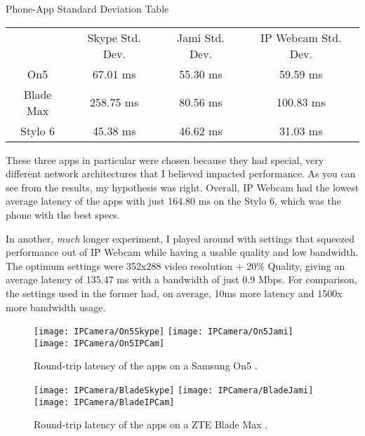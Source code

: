 \begin{centering}
Phone-App Standard Deviation Table\\[0.5cm]

\begin{tabular}{c|c|c|c}
    & Skype Std. Dev. & Jami Std. Dev. & IP Webcam Std. Dev. \\[0.5cm]
    On5 & 67.01 ms & 55.30 ms & 59.59 ms \\[0.5cm]
    Blade Max & 258.75 ms & 80.56 ms & 100.83 ms \\[0.5cm]
    Stylo 6 & 45.38 ms & 46.62 ms & 31.03 ms
\end{tabular} \newline

\end{centering}

These three apps in particular were chosen because they had special, very different network architectures that I believed impacted performance. As you can see from the results, my hypothesis was right. Overall, IP Webcam had the lowest average latency of the apps with just 164.80 ms on the Stylo 6, which was the phone with the best specs.

In another, \textit{much} longer experiment, I played around with settings that squeezed performance out of IP Webcam while having a usable quality and low bandwidth. The optimum settings were 352x288 video resolution + 20\% Quality, giving an average latency of 135.47 ms with a bandwidth of just 0.9 Mbps. For comparison, the settings used in the former had, on average, 10ms more latency and 1500x more bandwidth usage.


\begin{figure}[!htb]
    \centering
    \texttt{[image: IPCamera/On5Skype]}
    \texttt{[image: IPCamera/On5Jami]}
    \texttt{[image: IPCamera/On5IPCam]}
    \caption{
        Round-trip latency of the apps on a Samsung On5 \cite{On5}.
    }
\end{figure}

\begin{figure}[!htb]
    \centering
    \texttt{[image: IPCamera/BladeSkype]}
    \texttt{[image: IPCamera/BladeJami]}
    \texttt{[image: IPCamera/BladeIPCam]}
    \caption{
        Round-trip latency of the apps on a ZTE Blade Max \cite{BladeMax}.
    }
\end{figure}

